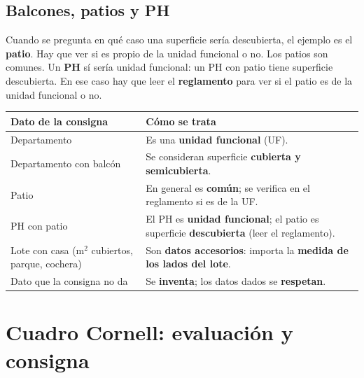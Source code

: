 \documentclass[12pt,oneside]{book}
\begin{document}
\subsection{Balcones, patios y PH}

Cuando se pregunta en qué caso una superficie sería descubierta, el ejemplo es el \textbf{patio}. Hay que ver si es propio de la unidad funcional o no. Los patios son comunes. Un \textbf{PH} sí sería unidad funcional: un PH con patio tiene superficie descubierta. En ese caso hay que leer el \textbf{reglamento} para ver si el patio es de la unidad funcional o no.

\begin{table}[H]
\centering
\begin{tabularx}{\textwidth}{
    >{\raggedright\arraybackslash}p{}
    >{\raggedright\arraybackslash}X
}
\toprule
\textbf{Dato de la consigna} & \textbf{Cómo se trata} \\
\midrule
Departamento & Es una \textbf{unidad funcional} (UF). \\
Departamento con balcón & Se consideran superficie \textbf{cubierta y semicubierta}. \\
Patio & En general es \textbf{común}; se verifica en el reglamento si es de la UF. \\
PH con patio & El PH es \textbf{unidad funcional}; el patio es superficie \textbf{descubierta} (leer el reglamento). \\
Lote con casa (m$^2$ cubiertos, parque, cochera) & Son \textbf{datos accesorios}: importa la \textbf{medida de los lados del lote}. \\
Dato que la consigna no da & Se \textbf{inventa}; los datos dados se \textbf{respetan}. \\
\bottomrule
\end{tabularx}
\end{table}

\section*{Cuadro Cornell: evaluación y consigna}
\end{document}
